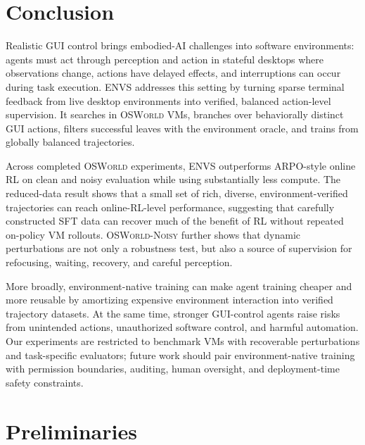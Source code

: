 \documentclass[11pt]{article}
\begin{document}
\section{Conclusion}

Realistic GUI control brings embodied-AI challenges into software
environments: agents must act through perception and action in stateful
desktops where observations change, actions have delayed effects, and
interruptions can occur during task execution. \textsc{ENVS} addresses
this setting by turning sparse terminal feedback from live desktop
environments into verified, balanced action-level supervision. It
searches in \textsc{OSWorld} VMs, branches over behaviorally distinct
GUI actions, filters successful leaves with the environment oracle, and
trains from globally balanced trajectories.

Across completed \textsc{OSWorld} experiments, \textsc{ENVS}
outperforms ARPO-style online RL on clean and noisy evaluation while
using substantially less compute. The reduced-data result shows that a
small set of rich, diverse, environment-verified trajectories can reach
online-RL-level performance, suggesting that carefully constructed SFT
data can recover much of the benefit of RL without repeated on-policy
VM rollouts. \textsc{OSWorld-Noisy} further shows that dynamic
perturbations are not only a robustness test, but also a source of
supervision for refocusing, waiting, recovery, and careful perception.

More broadly, environment-native training can make agent
training cheaper and more reusable by amortizing expensive environment
interaction into verified trajectory datasets. At the same time,
stronger GUI-control agents raise risks from unintended actions,
unauthorized software control, and harmful automation. Our experiments
are restricted to benchmark VMs with recoverable perturbations and
task-specific evaluators; future work should pair environment-native
training with permission boundaries, auditing, human oversight, and
deployment-time safety constraints.

\clearpage

{\small


}

\appendix

\section{Preliminaries}
\end{document}
